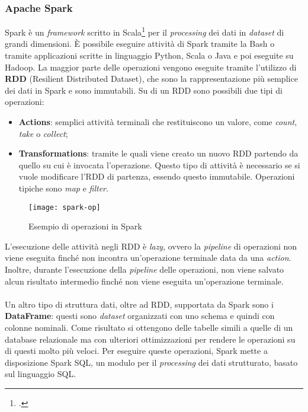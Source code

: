 \subsubsection{Apache Spark}
Spark è un \textit{framework} scritto in Scala\footcite{https://www.scala-lang.org/} per il \textit{processing} dei dati in \textit{dataset} di grandi dimensioni.
È possibile eseguire attività di Spark tramite la \gls{Bash} o tramite applicazioni scritte in linguaggio Python, Scala o Java e poi eseguite su Hadoop.
La maggior parte delle operazioni vengono eseguite tramite l'utilizzo di \textbf{RDD} (Resilient Distributed Dataset), che sono la rappresentazione più semplice dei dati in Spark e sono immutabili. Su di un RDD sono possibili due tipi di operazioni:
\begin{itemize}
	\item \textbf{Actions}: semplici attività terminali che restituiscono un valore, come \textit{count}, \textit{take} o \textit{collect}; 
	\item \textbf{Transformations}: tramite le quali viene creato un nuovo RDD partendo da quello su cui è invocata l'operazione. Questo tipo di attività è necessario se si vuole modificare l'RDD di partenza, essendo questo immutabile. Operazioni tipiche sono \textit{map} e \textit{filter}.
\end{itemize}
\begin{figure}[!h]
	\centering
	\texttt{[image: spark-op]}
	\caption{Esempio di operazioni in Spark}
\end{figure}
L'esecuzione delle attività negli RDD è \textit{lazy}, ovvero la \textit{pipeline} di operazioni non viene eseguita finché non incontra un'operazione terminale data da una \textit{action}. Inoltre, durante l'esecuzione della \textit{pipeline} delle operazioni, non viene salvato alcun risultato intermedio finché non viene eseguita un'operazione terminale.\\\\
Un altro tipo di struttura dati, oltre ad RDD, supportata da Spark sono i \textbf{DataFrame}: questi sono \textit{dataset} organizzati con uno schema e quindi con colonne nominali. Come risultato si ottengono delle tabelle simili a quelle di un database relazionale ma con ulteriori ottimizzazioni per rendere le operazioni su di questi molto più veloci. Per eseguire queste operazioni, Spark mette a disposizione Spark SQL, un modulo per il \textit{processing} dei dati strutturato, basato sul linguaggio SQL.
\newpage
